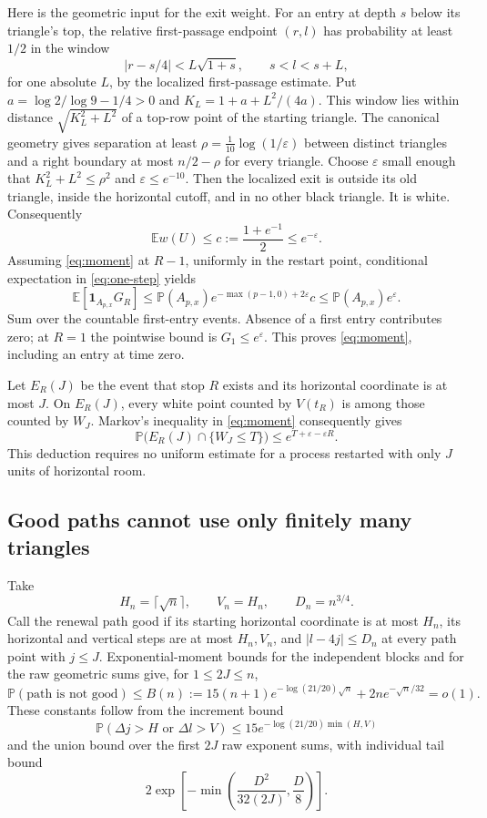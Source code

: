 \documentclass[11pt,a4paper]{article}
\newcommand{\E}{\mathbb E}
\newcommand{\PP}{\mathbb P}
\newcommand{\eps}{\varepsilon}
\newcommand{\abs}[1]{\left|#1\right|}
\begin{document}
Here is the geometric input for the exit weight. For an entry at depth
\(s\) below its triangle's top, the relative first-passage endpoint
\((r,l)\) has probability at least \(1/2\) in the window
\[
 \abs{r-s/4}<L\sqrt{1+s},\qquad s<l<s+L,
\]
for one absolute \(L\), by the localized first-passage estimate.
Put \(a=\log2/\log9-1/4>0\) and
\(K_L=1+a+L^2/(4a)\). This window lies within distance
\(\sqrt{K_L^2+L^2}\) of a top-row point of the starting triangle.
The canonical geometry gives separation at least
\(\rho=\frac1{10}\log(1/\eps)\) between distinct triangles and a
right boundary at most \(n/2-\rho\) for every triangle.
Choose \(\eps\) small enough that
\(K_L^2+L^2\le\rho^2\) and \(\eps\le e^{-10}\).
Then the localized exit is outside its old triangle, inside the
horizontal cutoff, and in no other black triangle. It is white.
Consequently
\[
 \E w(U)\le c:=\frac{1+e^{-1}}2\le e^{-\eps}.
\]
Assuming \eqref{eq:moment} at \(R-1\), uniformly in the restart
point, conditional expectation in \eqref{eq:one-step} yields
\[
 \E[\mathbf1_{A_{p,x}}G_R]
 \le\PP(A_{p,x})e^{-\max(p-1,0)+2\eps}c
 \le\PP(A_{p,x})e^\eps.
\]
Sum over the countable first-entry events. Absence of a first entry
contributes zero; at \(R=1\) the pointwise bound is
\(G_1\le e^\eps\). This proves \eqref{eq:moment}, including an
entry at time zero.

Let \(E_R(J)\) be the event that stop \(R\) exists and its horizontal
coordinate is at most \(J\). On \(E_R(J)\), every white point counted
by \(V(t_R)\) is among those counted by \(W_J\). Markov's inequality
in \eqref{eq:moment} consequently gives
\begin{equation}\label{eq:stopped-tail}
 \PP\bigl(E_R(J)\cap\{W_J\le T\}\bigr)
 \le e^{T+\eps-\eps R}.
\end{equation}
This deduction requires no uniform estimate for a process restarted
with only \(J\) units of horizontal room.

\subsection{Good paths cannot use only finitely many triangles}

Take
\[
 H_n=\lceil\sqrt n\rceil,\qquad V_n=H_n,\qquad D_n=n^{3/4}.
\]
Call the renewal path good if its starting horizontal coordinate is
at most \(H_n\), its horizontal and vertical steps are at most
\(H_n,V_n\), and
\(\abs{l-4j}\le D_n\) at every path point with \(j\le J\).
Exponential-moment bounds for the independent blocks and for the raw
geometric sums give, for \(1\le2J\le n\),
\begin{equation}\label{eq:bad-path}
 \PP(\text{path is not good})\le B(n):=
 15(n+1)e^{-\log(21/20)\sqrt n}
       +2n e^{-\sqrt n/32}=o(1).
\end{equation}
These constants follow from the increment bound
\[
 \PP(\Delta j>H\text{ or }\Delta l>V)
 \le15e^{-\log(21/20)\min(H,V)}
\]
and the union bound over the first \(2J\) raw exponent sums, with
individual tail bound
\[
 2\exp\left[-\min\left(\frac{D^2}{32(2J)},\frac D8\right)\right].
\]
\end{document}
